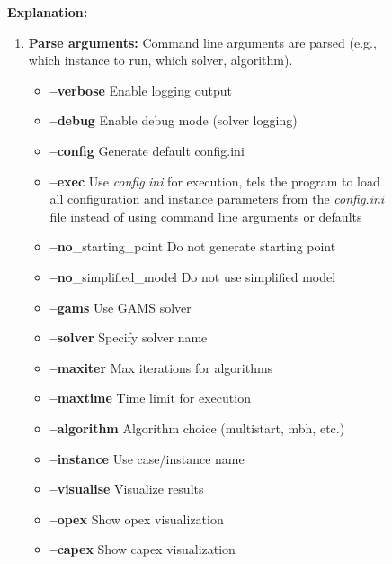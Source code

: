\documentclass[12pt]{article}
\theoremstyle{definition}
\theoremstyle{definition}
\theoremstyle{remark}
\theoremstyle{remark}
\theoremstyle{definition}
\theoremstyle{remark}
\begin{document}
\begin{figure}[H]
\begin{minipage}{0.25\textwidth}
    \end{minipage}\hfill
    \begin{minipage}{0.7\textwidth}
        \textbf{Explanation:} 
		\begin{enumerate}
			\item \textbf{Parse arguments:} Command line arguments are parsed (e.g., which instance to run, which solver, algorithm).
				\begin{itemize}
					\item \textbf{--verbose}                Enable logging output                                   
					\item \textbf{--debug}                  Enable debug mode (solver logging)                      
					\item \textbf{--config}                 Generate default config.ini                             
					\item \textbf{--exec}                   Use \emph{config.ini} for execution, tels the program to load all configuration and instance parameters from the \emph{config.ini} file instead of using command line arguments or defaults
					\item \textbf{--no}\_starting\_point      Do not generate starting point                          
					\item \textbf{--no}\_simplified\_model    Do not use simplified model                             
					\item \textbf{--gams}                   Use GAMS solver                                         
					\item \textbf{--solver}                 Specify solver name                                     
					\item \textbf{--maxiter}                Max iterations for algorithms                           
					\item \textbf{--maxtime}                Time limit for execution                                
					\item \textbf{--algorithm}              Algorithm choice (multistart, mbh, etc.)                
					\item \textbf{--instance}               Use case/instance name                                  
					\item \textbf{--visualise}              Visualize results                                       
					\item \textbf{--opex}                   Show opex visualization                                 
					\item \textbf{--capex}                  Show capex visualization                                

\end{itemize}
\end{enumerate}
\end{minipage}
\end{figure}
\end{document}
